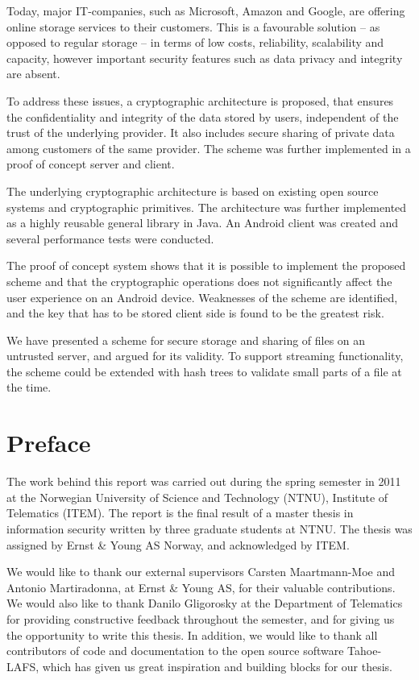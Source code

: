 \documentclass[pdftex,english,10pt,b5paper,twoside]{book}
\begin{document}
Today, major IT-companies, such as Microsoft, Amazon and Google, are offering
online storage services to their customers. This is a favourable solution -- as
opposed to regular storage -- in terms of low costs, reliability, scalability
and capacity, however important security features such as data privacy and
integrity are absent.

To address these issues, a cryptographic architecture is proposed, that ensures
the confidentiality and integrity of the data stored by users, independent of
the trust of the underlying provider. It also includes secure sharing of
private data among customers of the same provider. The scheme was further
implemented in a proof of concept server and client.

The underlying cryptographic architecture is based on existing open source
systems and cryptographic primitives. The architecture was further implemented
as a highly reusable general library in Java. An Android client was created and
several performance tests were conducted.

The proof of concept system shows that it is possible to implement the proposed
scheme and that the cryptographic operations does not significantly affect the
user experience on an Android device. Weaknesses of the scheme are identified,
and the key that has to be stored client side is found to be the greatest risk.

We have presented a scheme for secure storage and sharing of files on an
untrusted server, and argued for its validity. To support streaming
functionality, the scheme could be extended with hash trees to validate small
parts of a file at the time.

\chapter*{Preface}

The work behind this report was carried out during the spring semester in 2011
at the Norwegian University of Science and Technology (NTNU), Institute of
Telematics (ITEM). The report is the final result of a master thesis in
information security written by three graduate students at NTNU. The thesis was
assigned by Ernst \& Young AS Norway, and acknowledged by ITEM.

\vspace{13pt}

We would like to thank our external supervisors Carsten Maartmann-Moe and
Antonio Martiradonna, at Ernst \& Young AS, for their valuable contributions.
We would also like to thank Danilo Gligorosky at the Department of Telematics
for providing constructive feedback throughout the semester, and for giving us
the opportunity to write this thesis. In addition, we would like to thank all
contributors of code and documentation to the open source software Tahoe-LAFS,
which has given us great inspiration and building blocks for our thesis.
\end{document}

